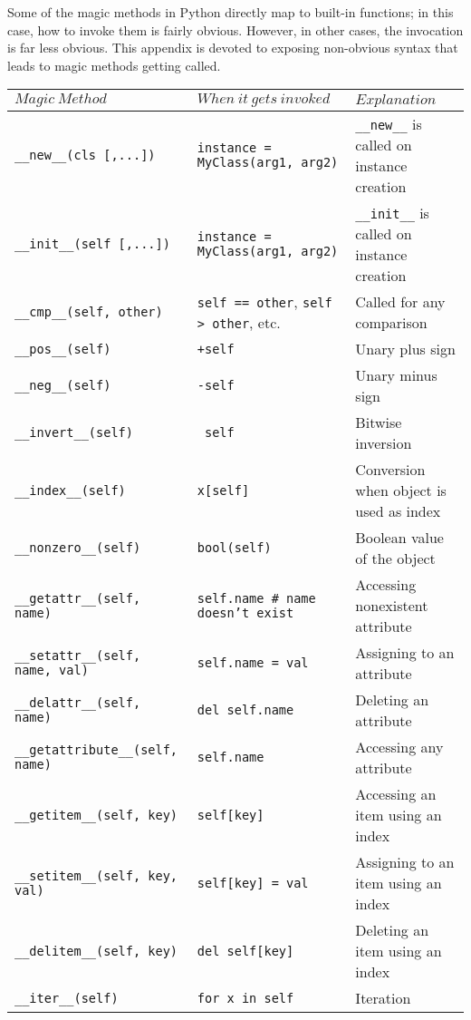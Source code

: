 \documentclass[a4paper,11pt]{article}
\newcommand{\code}[1]{\texttt{#1}}
\begin{document}
Some of the magic methods in Python directly map to built-in functions; in this case, how to invoke them is fairly obvious. However, in other cases, the invocation is far less obvious. This appendix is devoted to exposing non-obvious syntax that leads to magic methods getting called.
\begin{center}
\begin{tabular}{| p{5cm} | p{5cm} | p{5cm} |}
\hline
$Magic\ Method$ & $When\ it\ gets\ invoked$ & $Explanation$\\
\hline
\code{__new__(cls [,...])} & \code{instance = MyClass(arg1, arg2)} & \code{__new__} is called on instance creation\\
\hline
\code{__init__(self [,...])} & \code{instance = MyClass(arg1, arg2)} & \code{__init__} is called on instance creation\\
\hline
\code{__cmp__(self, other)} & \code{self == other}, \code{self > other}, etc. & Called for any comparison\\
\hline
\code{__pos__(self)} & \code{+self} & Unary plus sign\\
\hline
\code{__neg__(self)} & \code{-self} & Unary minus sign\\
\hline
\code{__invert__(self)} & \code{~self} & Bitwise inversion\\
\hline
\code{__index__(self)} & \code{x[self]} & Conversion when object is used as index\\
\hline
\code{__nonzero__(self)} & \code{bool(self)} & Boolean value of the object\\
\hline
\code{__getattr__(self, name)} & \code{self.name \# name doesn't exist} & Accessing nonexistent attribute\\
\hline
\code{__setattr__(self, name, val)} & \code{self.name = val} & Assigning to an attribute\\
\hline
\code{__delattr__(self, name)} & \code{del self.name} & Deleting an attribute\\
\hline
\code{__getattribute__(self, name)} & \code{self.name} & Accessing any attribute\\
\hline
\code{__getitem__(self, key)} & \code{self[key]} & Accessing an item using an index\\
\hline
\code{__setitem__(self, key, val)} & \code{self[key] = val} & Assigning to an item using an index\\
\hline
\code{__delitem__(self, key)} & \code{del self[key]} & Deleting an item using an index\\
\hline
\code{__iter__(self)} & \code{for x in self} & Iteration\\

\end{tabular}
\end{center}
\end{document}
